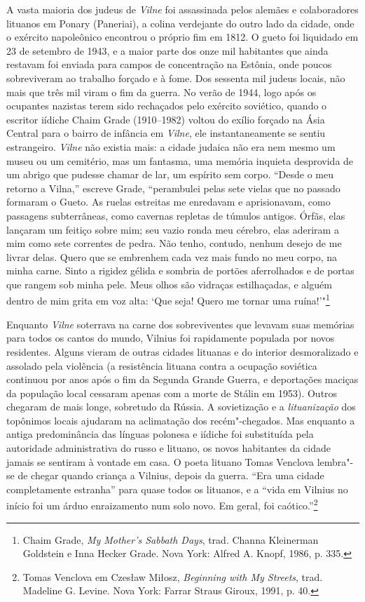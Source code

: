 A vasta maioria dos judeus de \textit{Vilne} foi assassinada pelos alemães e
colaboradores lituanos em Ponary (Paneriai), a colina verdejante do
outro lado da cidade, onde o exército napoleônico encontrou o próprio
fim em 1812. O gueto foi liquidado em 23 de setembro de 1943, e a maior
parte dos onze mil habitantes que ainda restavam foi enviada para campos
de concentração na Estônia, onde poucos sobreviveram ao trabalho forçado
e à fome. Dos sessenta mil judeus locais, não mais que três mil viram o
fim da guerra. No verão de 1944, logo após os ocupantes nazistas terem
sido rechaçados pelo exército soviético, quando o escritor iídiche Chaim
Grade (1910--1982) voltou do exílio forçado na Ásia Central para o bairro
de infância em \textit{Vilne}, ele instantaneamente se sentiu estrangeiro. \textit{Vilne}
não existia mais: a cidade judaica não era nem mesmo um museu ou um
cemitério, mas um fantasma, uma memória inquieta desprovida de um abrigo
que pudesse chamar de lar, um espírito sem corpo. ``Desde o meu retorno
a Vilna,'' escreve Grade, ``perambulei pelas sete vielas que no passado
formaram o Gueto. As ruelas estreitas me enredavam e aprisionavam, como
passagens subterrâneas, como cavernas repletas de túmulos antigos.
Órfãs, elas lançaram um feitiço sobre mim; seu vazio ronda meu cérebro,
elas aderiram a mim como sete correntes de pedra. Não tenho, contudo,
nenhum desejo de me livrar delas. Quero que se embrenhem cada vez mais
fundo no meu corpo, na minha carne. Sinto a rigidez gélida e sombria de
portões aferrolhados e de portas que rangem sob minha pele. Meus olhos
são vidraças estilhaçadas, e alguém dentro de mim grita em voz alta:
`Que seja! Quero me tornar uma ruína!'"\footnote{Chaim Grade, \textit{My Mother's Sabbath Days}, trad. Channa Kleinerman Goldstein e Inna Hecker Grade. Nova York: Alfred A. Knopf, 1986, p. 335.}

Enquanto \textit{Vilne} soterrava na carne dos sobreviventes que levavam suas
memórias para todos os cantos do mundo, Vilnius foi rapidamente populada
por novos residentes. Alguns vieram de outras cidades lituanas e do
interior desmoralizado e assolado pela violência (a resistência lituana
contra a ocupação soviética continuou por anos após o fim da Segunda
Grande Guerra, e deportações maciças da população local cessaram apenas
com a morte de Stálin em 1953). Outros chegaram de mais longe, sobretudo
da Rússia. A sovietização e a \textit{lituanização} dos topônimos locais ajudaram
na aclimatação dos recém"-chegados. Mas enquanto a antiga predominância
das línguas polonesa e iídiche foi substituída pela autoridade
administrativa do russo e lituano, os novos habitantes da cidade jamais
se sentiram à vontade em casa. O poeta lituano Tomas Venclova lembra"-se
de chegar quando criança a Vilnius, depois da guerra. ``Era uma cidade
completamente estranha'' para quase todos os lituanos, e a ``vida em
Vilnius no início foi um árduo enraizamento num solo novo. Em geral, foi
caótico.''\footnote{Tomas Venclova em Czesław Miłosz, \textit{Beginning with My Streets}, trad. Madeline G. Levine. Nova York: Farrar Straus Giroux, 1991, p. 40.}

